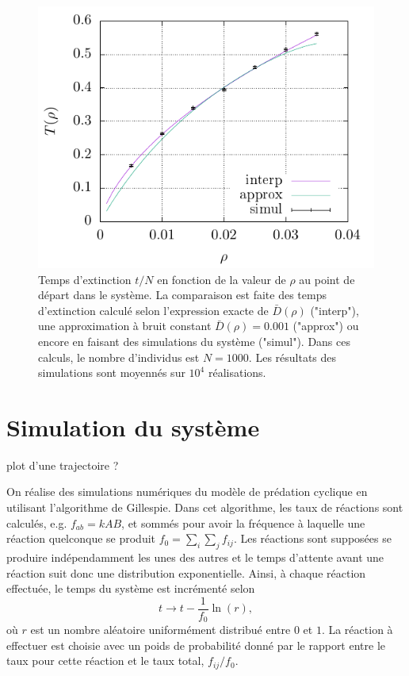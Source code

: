 \documentclass[openany,a4paper,12pt]{article}
\begin{document}
\begin{figure}[t]
	\centering
	\includegraphics[width=0.9\linewidth]{figures/extc_time_comparison}
	\caption{Temps d'extinction $t/N$ en fonction de la valeur de $\rho$ au point de départ dans le système. La comparaison est faite des temps d'extinction calculé selon l'expression exacte de $\bar D(\rho)$ ("interp"), une approximation à bruit constant $\bar D(\rho)=0.001$ ("approx") ou encore en faisant des simulations du système ("simul"). Dans ces calculs, le nombre d'individus est $N=1000$. Les résultats des simulations sont moyennés sur $10^4$ réalisations.}
	\label{fig:T_extc}
\end{figure}


\section{Simulation du système}
\label{section_simulation}

{\color{red} plot d'une trajectoire ?}

\par On réalise des simulations numériques du modèle de prédation cyclique en utilisant l'algorithme de Gillespie. Dans cet algorithme, les taux de réactions sont calculés, e.g. $f_{ab} = k AB$, et sommés pour avoir la fréquence à laquelle une réaction quelconque se produit $f_0 = \sum_i\sum_j f_{ij}$. Les réactions sont supposées se produire indépendamment les unes des autres et le temps d'attente avant une réaction suit donc une distribution exponentielle. Ainsi, à chaque réaction effectuée, le temps du système est incrémenté selon
%
\begin{equation}\label{gillespie_incr_temps}
	t \rightarrow t - \frac{1}{f_0} \ln(r),
\end{equation}
%
où $r$ est un nombre aléatoire uniformément distribué entre $0$ et $1$.
La réaction à effectuer est choisie avec un poids de probabilité donné par le rapport entre le taux pour cette réaction et le taux total, $f_{ij}/f_0$.
\end{document}
